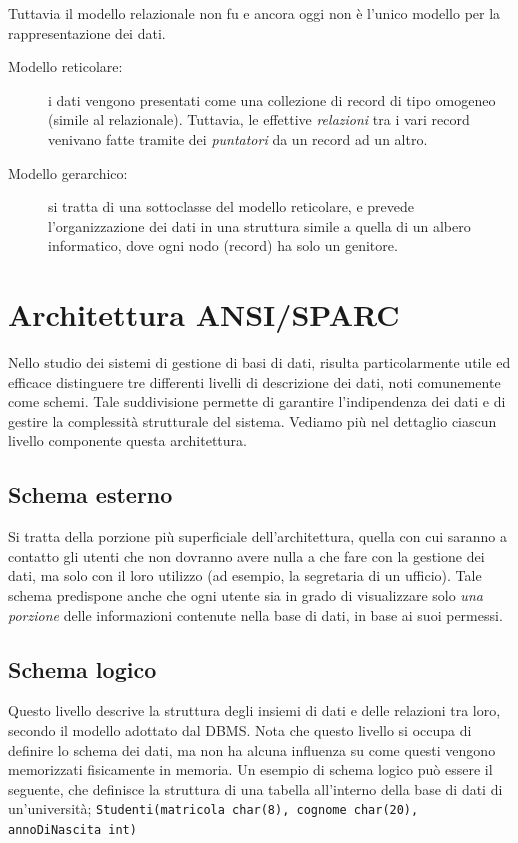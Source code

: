 \documentclass[12pt]{report}
\begin{document}
	Tuttavia il modello relazionale non fu e ancora oggi non è l'unico modello per la rappresentazione dei dati.
	\begin{description}
		\item [Modello reticolare:] i dati vengono presentati come una collezione di record di tipo omogeneo (simile al relazionale). Tuttavia, le effettive \textit{relazioni} tra i vari record venivano fatte tramite dei \textit{puntatori} da un record ad un altro.
		
		\item [Modello gerarchico:] si tratta di una sottoclasse del modello reticolare, e prevede l'organizzazione dei dati in una struttura simile a quella di un albero informatico, dove ogni nodo (record) ha solo un genitore.
	\end{description}
	
	\section{Architettura ANSI/SPARC}
	Nello studio dei sistemi di gestione di basi di dati, risulta particolarmente utile ed efficace distinguere tre differenti livelli di descrizione dei dati, noti comunemente come schemi. Tale suddivisione permette di garantire l'indipendenza dei dati e di gestire la complessità strutturale del sistema.
	Vediamo più nel dettaglio ciascun livello componente questa architettura.
	
	\subsection{Schema esterno}
	Si tratta della porzione più superficiale dell'architettura, quella con cui saranno a contatto gli utenti che non dovranno avere nulla a che fare con la gestione dei dati, ma solo con il loro utilizzo (ad esempio, la segretaria di un ufficio).
	Tale schema predispone anche che ogni utente sia in grado di visualizzare solo \textit{una porzione} delle informazioni contenute nella base di dati, in base ai suoi permessi.
	
	\subsection{Schema logico}
	Questo livello descrive la struttura degli insiemi di dati e delle relazioni tra loro, secondo il modello adottato dal DBMS. Nota che questo livello si occupa di definire lo schema dei dati, ma non ha alcuna influenza su come questi vengono memorizzati fisicamente in memoria.
	Un esempio di schema logico può essere il seguente, che definisce la struttura di una tabella all'interno della base di dati di un'università; \texttt{Studenti(matricola char(8), cognome char(20), annoDiNascita int)}
	
\end{document}
